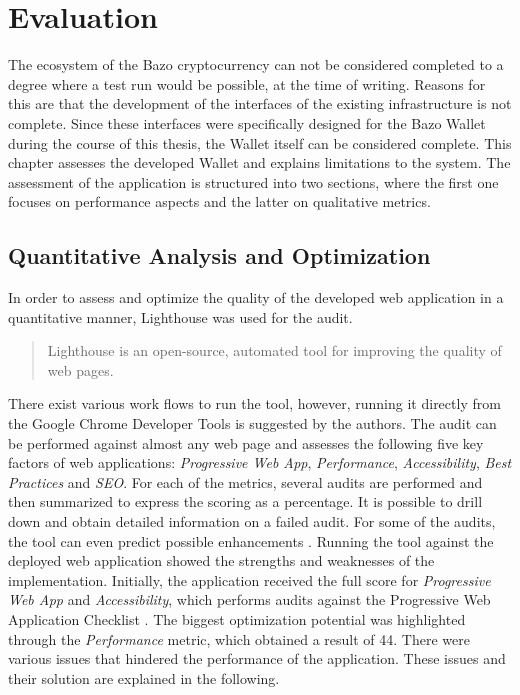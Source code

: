 \chapter{Evaluation}
The ecosystem of the Bazo cryptocurrency can not be considered completed to a degree where a test run would be possible, at the time of writing. Reasons for this are that the development of the interfaces of the existing infrastructure is not complete. Since these interfaces were specifically designed for the Bazo Wallet during the course of this thesis, the Wallet itself can be considered complete. This chapter assesses the developed Wallet and explains limitations to the system. The assessment of the application is structured into two sections, where the first one focuses on performance aspects and the latter on qualitative metrics.

\section{Quantitative Analysis and Optimization}\label{testing}
In order to assess and optimize the quality of the developed web application in a quantitative manner, Lighthouse was used for the audit. \begin{quote}
Lighthouse is an open-source, automated tool for improving the quality of web pages.
\end{quote}
There exist various work flows to run the tool, however, running it directly from the Google Chrome Developer Tools is suggested by the authors. The audit can be performed against almost any web page and assesses the following five key factors of web applications: \textit{Progressive Web App}, \textit{Performance}, \textit{Accessibility}, \textit{Best Practices} and \textit{SEO}. For each of the metrics, several audits are performed and then summarized to express the scoring as a percentage. It is possible to drill down and obtain detailed information on a failed audit. For some of the audits, the tool can even predict possible enhancements \cite{lighthouse}.
Running the tool against the deployed web application showed the strengths and weaknesses of the implementation. Initially, the application received the full score for \textit{Progressive Web App} and \textit{Accessibility}, which performs audits against the Progressive Web Application Checklist \cite{pwachecklist}. The biggest optimization potential was highlighted through the \textit{Performance} metric, which obtained a result of 44. There were various issues that hindered the performance of the application. These issues and their solution are explained in the following.
